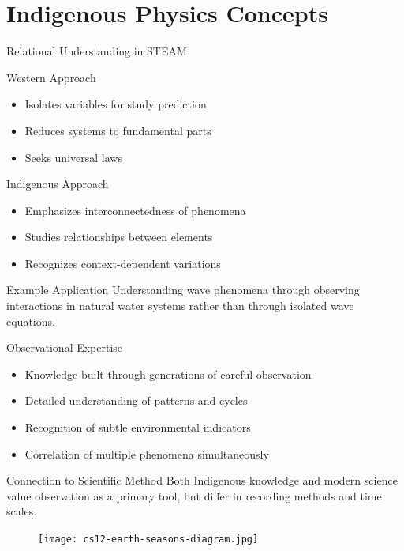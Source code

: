 \documentclass{beamer}
\begin{document}
\section{Indigenous Physics Concepts}

\begin{frame}{Relational Understanding in STEAM}
    \begin{block}{Western Approach}
        \begin{itemize}
            \item Isolates variables for study prediction
            \item Reduces systems to fundamental parts
            \item Seeks universal laws
        \end{itemize}
    \end{block}
    
    \begin{block}{Indigenous Approach}
        \begin{itemize}
            \item Emphasizes interconnectedness of phenomena
            \item Studies relationships between elements
            \item Recognizes context-dependent variations
        \end{itemize}
    \end{block}
    
    \begin{exampleblock}{Example Application}
        Understanding wave phenomena through observing interactions in natural water systems rather than through isolated wave equations.
    \end{exampleblock}
\end{frame}

\begin{frame}{Observational Expertise}
    \begin{itemize}
        \item Knowledge built through generations of careful observation
        \item Detailed understanding of patterns and cycles
        \item Recognition of subtle environmental indicators
        \item Correlation of multiple phenomena simultaneously
    \end{itemize}
    
    \begin{alertblock}{Connection to Scientific Method}
        Both Indigenous knowledge and modern science value observation as a primary tool, but differ in recording methods and time scales.
    \end{alertblock}
    
   \begin{figure}
       \centering
       \texttt{[image: cs12-earth-seasons-diagram.jpg]}
   \end{figure}
\end{frame}
\end{document}
